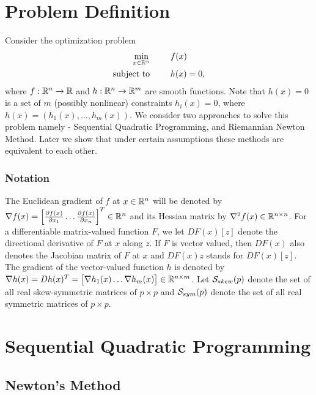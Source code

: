 \documentclass[11pt,a4paper]{article}
\begin{document}
\section{Problem Definition}

Consider the optimization problem
\begin{alignat}{3}
\underset{x\in\mathbb{R}^n}{\text{min}}& &&f(x) \nonumber\\
\text{subject to}&\hspace{0.5cm} &&h(x) = 0, \label{eqn:optimization_problem}
\end{alignat}
where $f:\mathbb{R}^n\rightarrow \mathbb{R}$ and $h:\mathbb{R}^n\rightarrow \mathbb{R}^m$ are smooth functions. Note that $h(x) = 0$ is a set of $m$ (possibly nonlinear) constraints $h_i(x) = 0$, where $h(x) = (h_1(x),\ldots,h_m(x))$. We consider two approaches to solve this problem namely - Sequential Quadratic Programming, and Riemannian Newton Method. Later we show that under certain assumptions these methods are equivalent to each other.

\subsubsection*{Notation} The Euclidean gradient of $f$ at $x\in\mathbb{R}^n$ will be denoted by $\nabla f(x) = \Big[\frac{\partial f(x)}{\partial x_{1}} \ldots \frac{\partial f(x)}{\partial x_{n}}\Big]^T\in \mathbb{R}^n$ and its Hessian matrix by $\nabla^2 f(x)\in \mathbb{R}^{n\times n}$. For a differentiable matrix-valued function $F$, we let $DF(x)[z]$ denote the directional derivative of $F$ at $x$ along $z$. If $F$ is vector valued, then $DF(x)$ also denotes the Jacobian matrix of $F$ at $x$ and $DF(x)z$ stands for $DF(x)[z]$. The gradient of the vector-valued function $h$ is denoted by $\nabla h(x) = D h(x)^T =\big[ \nabla h_1(x) \ldots \nabla h_m(x)\big]\in \mathbb{R}^{n\times m}$. Let $\mathcal{S}_{skew}(p)$ denote the set of all real skew-symmetric matrices of $p\times p$ and $\mathcal{S}_{sym}(p)$ denote the set of all real symmetric matrices of $p\times p$. 

\section{Sequential Quadratic Programming}

\subsection{Newton's Method}
\end{document}
